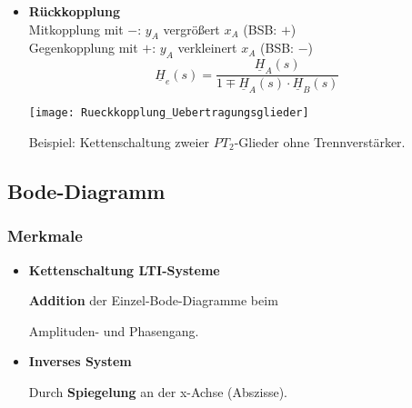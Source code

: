 \begin{itemize}
\begin{center}
        \end{center}
    \item \textbf{Rückkopplung}\\
    Mitkopplung mit $-$: $y_A$ vergrößert $x_A$ (BSB: $+$)\\
    Gegenkopplung mit $+$: $y_A$ verkleinert $x_A$ (BSB: $-$)
    \[
    \boxed{\underline{H}_{e}(s)=\frac{\underline{H}_{A}(s)}{1\mp\underline{H}_{A}(s) \cdot \underline{H}_{B}(s)}}
    \]
    \begin{center}
    	\texttt{[image: Rueckkopplung\_Uebertragungsglieder]}
    \end{center}
    Beispiel: Kettenschaltung zweier $PT_2$-Glieder ohne Trennverst\"arker.
    \end{itemize}
 
 \subsection{Bode-Diagramm}
 \subsubsection{Merkmale}
 \begin{itemize}
 	\item \textbf{Kettenschaltung LTI-Systeme}
 	
 	\textbf{Addition} der Einzel-Bode-Diagramme beim \par Amplituden- und Phasengang. 
 	
 	\item \textbf{Inverses System}
 	
 	Durch \textbf{Spiegelung} an der x-Achse (Abszisse). 
 \end{itemize}
 
